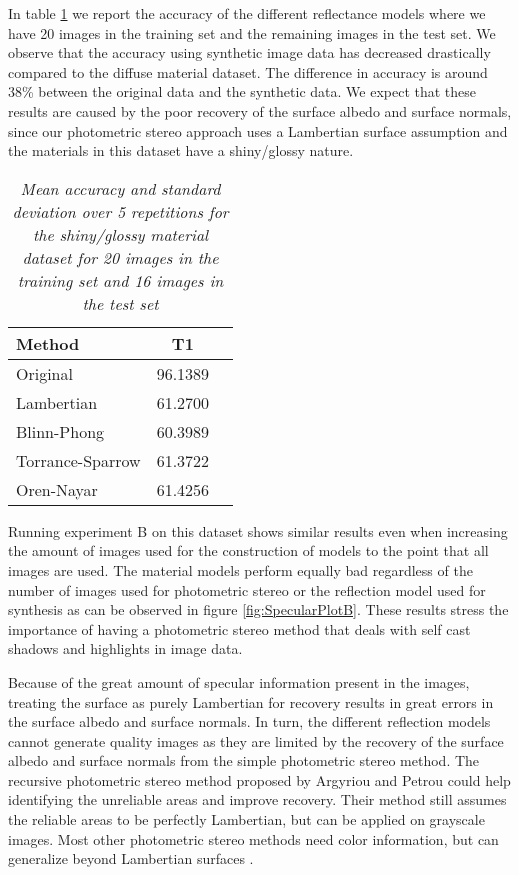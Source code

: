 In table \ref{tab:SpecularResultsA} we report the accuracy of the different reflectance models where we have 20 images in the training set and the remaining images in the test set. We observe that the accuracy using synthetic image data has decreased drastically compared to the diffuse material dataset. The difference in accuracy is around 38\% between the original data and the synthetic data. We expect that these results are caused by the poor recovery of the surface albedo and surface normals, since our photometric stereo approach uses a Lambertian surface assumption and the materials in this dataset have a shiny/glossy nature. 

\begin{table}
	\center
	\begin{tabular}{l|c|r}
	Method 				&	T1\\
	\hline
	Original			&	96.1389\\
	Lambertian 			&	61.2700\\
	Blinn-Phong 		& 	60.3989\\
	Torrance-Sparrow 	&	61.3722\\
	Oren-Nayar 			&	61.4256\\
	\end{tabular}
	\caption{{\it Mean accuracy and standard deviation over 5 repetitions for the shiny/glossy material dataset for 20 images in the training set and 16 images in the test set}}
	\label{tab:SpecularResultsA}
\end{table}

Running experiment B on this dataset shows similar results even when increasing the amount of images used for the construction of models to the point that all images are used. The material models perform equally bad regardless of the number of images used for photometric stereo or the reflection model used for synthesis as can be observed in figure \ref{fig:SpecularPlotB}. These results stress the importance of having a photometric stereo method that deals with self cast shadows and highlights in image data. 

Because of the great amount of specular information present in the images, treating the surface as purely Lambertian for recovery results in great errors in the surface albedo and surface normals. In turn, the different reflection models cannot generate quality images as they are limited by the recovery of the surface albedo and surface normals from the simple photometric stereo method. The recursive photometric stereo method proposed by Argyriou and Petrou \cite{RecursivePS} could help identifying the unreliable areas and improve recovery. Their method still assumes the reliable areas to be perfectly Lambertian, but can be applied on grayscale images. Most other photometric stereo methods need color information, but can generalize beyond Lambertian surfaces \cite{ConsensusPS}.

